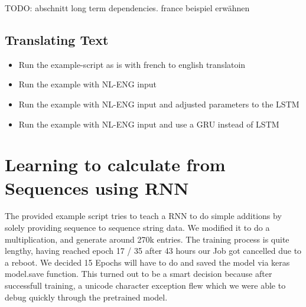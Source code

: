 \documentclass{article}[]
\begin{document}
TODO: abschnitt long term dependencies. france beispiel erwähnen

\subsection{Translating Text}
\label{sec:trans}
\begin{itemize}
\item{Run the example-script as is with french to english translatoin}
\item{Run the example with NL-ENG input}
\item{Run the example with NL-ENG input and adjusted parameters to the LSTM}
\item{Run the example with NL-ENG input and use a GRU instead of LSTM}
\end{itemize}

\section{Learning to calculate from Sequences using RNN}
\label{sec:rnn}


The provided example script tries to teach a RNN to do simple additions by solely providing sequence to sequence string data.
We modified it to do a multiplication, and generate around 270k entries. The training process is quite lengthy, having reached epoch 17 / 35 after 43 hours our Job got cancelled due to a reboot.
We decided 15 Epochs will have to do and saved the model via keras model.save function. This turned out to be a smart decision because after successfull training, a unicode character exception flew which we were able to debug quickly through the pretrained model.
\end{document}

